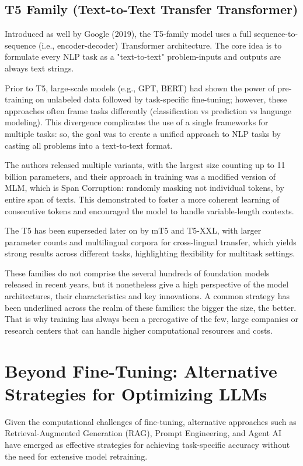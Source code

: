 \subsection{T5 Family (Text-to-Text Transfer Transformer)}

Introduced as well by Google (2019), the T5-family model uses a full sequence-to-sequence (i.e., encoder-decoder) Transformer architecture. The core idea is to formulate every NLP task as a "text-to-text" problem-inputs and outputs are always text strings.

Prior to T5, large-scale models (e.g., GPT, BERT) had shown the power of pre-training on unlabeled data followed by task-specific fine-tuning; however, these approaches often frame tasks differently (classification vs prediction vs language modeling). This divergence complicates the use of a single frameworks for multiple tasks: so, the goal was to create a unified approach to NLP tasks by casting all problems into a text-to-text format.

The authors released multiple variants, with the largest size counting up to 11 billion parameters, and their approach in training was a modified version of MLM, which is Span Corruption: randomly masking not individual tokens, by entire span of texts. This demonstrated to foster a more coherent learning of consecutive tokens and encouraged the model to handle variable-length contexts.

The T5 has been superseded later on by mT5 and T5-XXL, with larger parameter counts and multilingual corpora for cross-lingual transfer, which yields strong results across different tasks, highlighting flexibility for multitask settings.

These families do not comprise the several hundreds of foundation models released in recent years, but it nonetheless give a high perspective of the model architectures, their characteristics and key innovations. A common strategy has been underlined across the realm of these families: the bigger the size, the better. That is why training has always been a prerogative of the few, large companies or research centers that can handle higher computational resources and costs.


\section{Beyond Fine-Tuning: Alternative Strategies for Optimizing LLMs}

Given the computational challenges of fine-tuning, alternative approaches such as Retrieval-Augmented Generation (RAG), Prompt Engineering, and Agent AI have emerged as effective strategies for achieving task-specific accuracy without the need for extensive model retraining.

